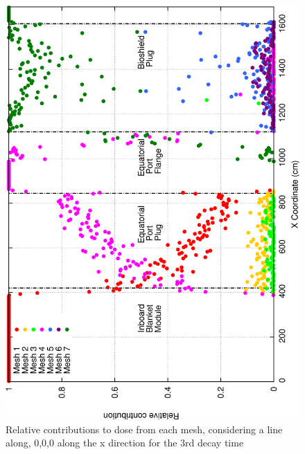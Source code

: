 \documentclass[12pt]{article}
\begin{document}
\begin{figure}[ht!]
\centering
\includegraphics[clip,scale=0.25]{../plots/crosstalk/nob4c/ep/dc3_rel.png}
\caption{Relative contributions to dose from each mesh, considering a line along, 0,0,0 along the x direction for the 3rd decay time}
\label{fig:ct_ep_dc3_rel}
\end{figure}
\newpage
\clearpage
\end{document}
